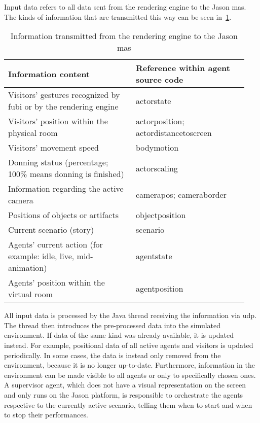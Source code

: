 \documentclass[draft,final]{vutinfth} %
\begin{document}
Input data refers to all data sent from the rendering engine to the Jason \gls{mas}. 
The kinds of information that are transmitted this way can be seen in~\ref{tab:jason_input}.
\begin{table}
	\begin{tabular}{p{0.5\linewidth}|p{0.44\linewidth}}
		\toprule
		Information content & Reference within agent source code  \\
		\midrule
		Visitors’ gestures recognized by \gls{fubi} or by the rendering engine	& actorstate \\ %
		Visitors’ position within the physical room							& actorposition; actordistancetoscreen \\ %
		Visitors’ movement speed											& bodymotion \\ %
		Donning status (percentage; 100\% means donning is finished)		& actorscaling \\ %
		Information regarding the active camera								& camerapos; cameraborder \\ %
		Positions of objects or artifacts									& objectposition \\ %
		Current scenario (story)											& scenario \\ %
		Agents’ current action (for example: idle, live, mid-animation)		& agentstate \\ %
		Agents’ position within the virtual room							& agentposition \\ %
		\bottomrule
	\end{tabular}
	\caption{Information transmitted from the rendering engine to the Jason \gls{mas}}
	\label{tab:jason_input}
\end{table}
All input data is processed by the Java thread receiving the information via \gls{udp}. 
The thread then introduces the pre-processed data into the simulated environment. 
If data of the same kind was already available, it is updated instead. 
For example, positional data of all active agents and \glspl{visitor} is updated periodically. 
In some cases, the data is instead only removed from the environment, because it is no longer up-to-date. 
Furthermore, information in the environment can be made visible to all agents or only to specifically chosen ones. 
A supervisor agent, which does not have a visual representation on the screen and only runs on the Jason platform, is responsible to orchestrate the agents respective to the currently active scenario, telling them when to start and when to stop their performances. 
\end{document}
